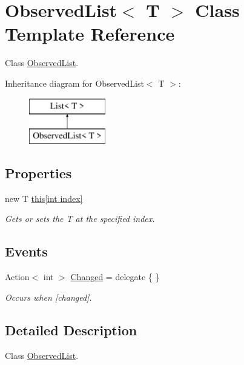 \hypertarget{class_observed_list}{}\section{Observed\+List$<$ T $>$ Class Template Reference}
\label{class_observed_list}


Class \hyperlink{class_observed_list}{Observed\+List}.  


Inheritance diagram for Observed\+List$<$ T $>$\+:\begin{figure}[H]
\begin{center}
\leavevmode
\includegraphics[height=2.000000cm]{class_observed_list}
\end{center}
\end{figure}
\subsection*{Properties}
\begin{DoxyCompactItemize}
\item 
new T \hyperlink{class_observed_list_a87636f926bf60362db38cddc0740960b}{this\mbox{[}int index\mbox{]}}
\begin{DoxyCompactList}\small\item\em Gets or sets the T at the specified index. \end{DoxyCompactList}\end{DoxyCompactItemize}
\subsection*{Events}
\begin{DoxyCompactItemize}
\item 
Action$<$ int $>$ \hyperlink{class_observed_list_a0f2e4ec62d0fbcb270aab7a81005e7b1}{Changed} = delegate \{ \}
\begin{DoxyCompactList}\small\item\em Occurs when \mbox{[}changed\mbox{]}. \end{DoxyCompactList}\end{DoxyCompactItemize}


\subsection{Detailed Description}
Class \hyperlink{class_observed_list}{Observed\+List}. 


